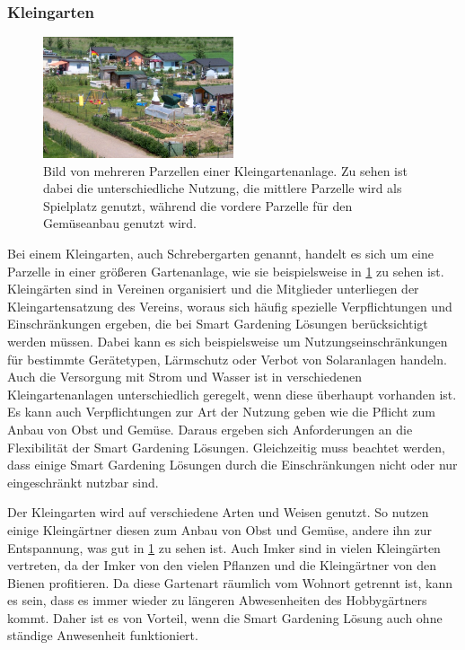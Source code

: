 \pagebreak

\subsubsection{Kleingarten}
\begin{figure}[!htb]
	\centering
	\includegraphics[width=0.5\textwidth]{images/Kleingarten.jpg}
	\caption[Bild von mehreren Parzellen einer Kleingartenanlage.]{
		Bild von mehreren Parzellen einer Kleingartenanlage.
		Zu sehen ist dabei die unterschiedliche Nutzung, die mittlere Parzelle wird als Spielplatz genutzt, während die vordere Parzelle für den Gemüseanbau genutzt wird.\footnotemark
	}
	\label{pic:kleingarten}
\end{figure}


Bei einem Kleingarten, auch Schrebergarten genannt, handelt es sich um eine Parzelle in einer größeren Gartenanlage, wie sie beispielsweise in \cref{pic:kleingarten} zu sehen ist.
Kleingärten sind in Vereinen organisiert und die Mitglieder unterliegen der Kleingartensatzung des Vereins, woraus sich häufig spezielle Verpflichtungen und Einschränkungen ergeben, die bei Smart Gardening Lösungen berücksichtigt werden müssen.
Dabei kann es sich beispielsweise um Nutzungseinschränkungen für bestimmte Gerätetypen, Lärmschutz oder Verbot von Solaranlagen handeln.
Auch die Versorgung mit Strom und Wasser ist in verschiedenen Kleingartenanlagen unterschiedlich geregelt, wenn diese überhaupt vorhanden ist.
Es kann auch Verpflichtungen zur Art der Nutzung geben wie die Pflicht zum Anbau von Obst und Gemüse.
Daraus ergeben sich Anforderungen an die Flexibilität der Smart Gardening Lösungen.
Gleichzeitig muss beachtet werden, dass einige Smart Gardening Lösungen durch die Einschränkungen nicht oder nur eingeschränkt nutzbar sind.

Der Kleingarten wird auf verschiedene Arten und Weisen genutzt.
So nutzen einige Kleingärtner diesen zum Anbau von Obst und Gemüse, andere ihn zur Entspannung, was gut in \cref{pic:kleingarten} zu sehen ist.
Auch Imker sind in vielen Kleingärten vertreten, da der Imker von den vielen Pflanzen und die Kleingärtner von den Bienen profitieren.
Da diese Gartenart räumlich vom Wohnort getrennt ist, kann es sein, dass es immer wieder zu längeren Abwesenheiten des Hobbygärtners kommt.
Daher ist es von Vorteil, wenn die Smart Gardening Lösung auch ohne ständige Anwesenheit funktioniert.

